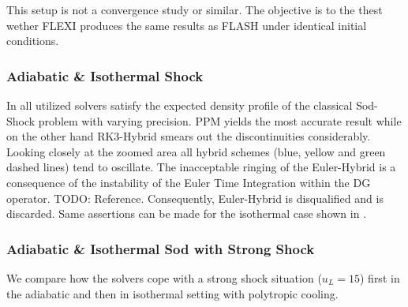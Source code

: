 This setup is not a convergence study or similar. The objective is to the thest
wether FLEXI produces the same results as FLASH under identical initial
conditions.


\subsubsection{Adiabatic \& Isothermal Shock}
In  all utilized solvers satisfy the
expected density profile of the classical Sod-Shock problem with varying
precision. PPM yields the most accurate result while on the other hand
RK3-Hybrid smears out the discontinuities considerably. Looking closely at the
zoomed area all hybrid schemes (blue, yellow and green dashed lines) tend to
oscillate.  The inacceptable ringing of the Euler-Hybrid is a consequence of
the instability of the Euler Time Integration within the DG operator. TODO:
Reference. Consequently, Euler-Hybrid is disqualified and is discarded.
Same assertions can be made for the isothermal case shown in
.

\subsubsection{Adiabatic \& Isothermal Sod with Strong Shock}
We compare how the solvers cope with a strong shock situation ($u_L = 15$)
first in the adiabatic and then in isothermal setting with polytropic cooling.

